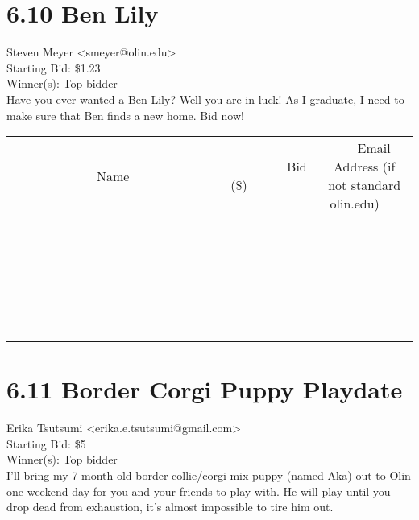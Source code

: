 \documentclass[11pt]{article}
\begin{document}
					\section*{6.10 Ben Lily}
					Steven Meyer <smeyer@olin.edu> \\
					Starting Bid: \$1.23 \\
					Winner(s): Top bidder \\
					Have you ever wanted a Ben Lily? Well you are in luck! As I graduate, I need to make sure that Ben finds a new home. Bid now! \\
					[6ex]
					\begin{tabular}{c c c}
						~~~~~~~~~~~~~Name~~~~~~~~~~~~~ & ~~~~~~~~~Bid (\$)~~~~~~~~~ & ~~~Email Address (if not standard olin.edu)~~~ \\
				
 & & \\
\hline
 & & \\
\hline
 & & \\
\hline
 & & \\
\hline
 & & \\
\hline
 & & \\
\hline
 & & \\
\hline
 & & \\
\hline
 & & \\
\hline
 & & \\
\hline
 & & \\
\hline
 & & \\
\hline
 & & \\
\hline
 & & \\
\hline
 & & \\
\hline
 & & \\
\hline
 & & \\
\hline
 & & \\
\hline
 & & \\
\hline
 & & \\
\hline
 & & \\
\hline
 & & \\
\hline
 & & \\
\hline
 & & \\
\hline
 & & \\
\hline
 & & \\
\hline
					\end{tabular}
					\clearpage
				
					\section*{6.11 Border Corgi Puppy Playdate}
					Erika Tsutsumi <erika.e.tsutsumi@gmail.com> \\
					Starting Bid: \$5 \\
					Winner(s): Top bidder \\
					I'll bring my 7 month old border collie/corgi mix puppy (named Aka) out to Olin one weekend day for you and your friends to play with. He will play until you drop dead from exhaustion, it's almost impossible to tire him out. 
\end{document}
